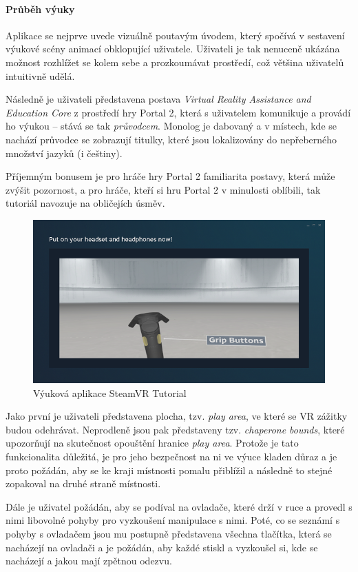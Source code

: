 \paragraph{Průběh výuky}\label{prux16fbux11bh-vuxfduky}

Aplikace se nejprve uvede vizuálně poutavým úvodem, který spočívá v
sestavení výukové scény animací obklopující uživatele. Uživateli je tak nenuceně
ukázána možnost rozhlížet se kolem sebe a prozkoumávat prostředí, což
většina uživatelů intuitivně udělá.

Následně je uživateli představena postava \emph{Virtual Reality
Assistance and Education Core} z prostředí hry Portal 2, která s uživatelem
komunikuje a provádí ho výukou -- stává se tak \emph{průvodcem}. Monolog
je dabovaný a v místech, kde se nachází průvodce se zobrazují titulky,
které jsou lokalizovány do nepřeberného množství jazyků (i češtiny).

Příjemným bonusem je pro hráče hry Portal 2 familiarita postavy, která
může zvýšit pozornost, a pro hráče, kteří si hru Portal 2 v
minulosti oblíbili, tak tutoriál navozuje na obličejích úsměv.

\begin{figure}
\centering
\includegraphics[width=12cm]{src/assets/steamvr-tutorial.png}
\caption{Výuková aplikace SteamVR Tutorial}
\end{figure}

Jako první je uživateli představena plocha, tzv. \emph{play area}, ve
které se VR zážitky budou odehrávat. Neprodleně jsou pak představeny
tzv. \emph{chaperone bounds}, které upozorňují na skutečnost opouštění 
hranice \emph{play area}. Protože je tato funkcionalita
důležitá, je pro jeho bezpečnost na ni ve výuce kladen důraz a je proto
požádán, aby se ke kraji místnosti pomalu přiblížil a následně to stejné
zopakoval na druhé straně místnosti.

Dále je uživatel požádán, aby se podíval na ovladače, které drží v ruce
a provedl s nimi libovolné pohyby pro vyzkoušení manipulace s nimi.
Poté, co se seznámí s pohyby s ovladačem jsou mu postupně představena
všechna tlačítka, která se nacházejí na ovladači a je požádán, aby každé
stiskl a vyzkoušel si, kde se nacházejí a jakou mají zpětnou odezvu.

